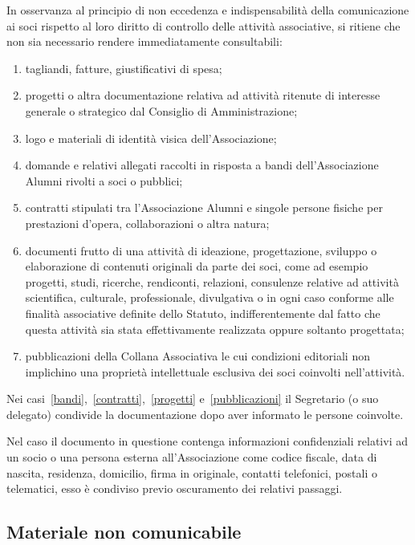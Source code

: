 In osservanza al principio di non eccedenza e indispensabilità della comunicazione ai soci rispetto al loro diritto di controllo delle attività associative, si ritiene che non sia necessario rendere immediatamente consultabili:
\begin{enumerate}
    \item tagliandi, fatture, giustificativi di spesa;
    \item progetti o altra documentazione relativa ad attività ritenute di interesse generale o strategico dal Consiglio di Amministrazione; 
    \item logo e materiali di identità visica dell’Associazione; 
    \item\label{bandi} domande e relativi allegati raccolti in risposta a bandi dell’Associazione Alumni rivolti a soci o pubblici;
    \item\label{contratti} contratti stipulati tra l’Associazione Alumni e singole persone fisiche per prestazioni d’opera, collaborazioni o altra natura; 
    \item\label{progetti} documenti frutto di una attività di ideazione, progettazione, sviluppo o elaborazione di contenuti originali da parte dei soci, come ad esempio progetti, studi, ricerche, rendiconti, relazioni, consulenze relative ad attività scientifica, culturale, professionale, divulgativa o in ogni caso conforme alle finalità associative definite dello Statuto, indifferentemente dal fatto che questa attività sia stata effettivamente realizzata oppure soltanto progettata; 
    \item\label{pubblicazioni} pubblicazioni della Collana Associativa le cui condizioni editoriali non implichino una proprietà intellettuale esclusiva dei soci coinvolti nell’attività.
\end{enumerate}
Nei casi~\ref{bandi},~\ref{contratti},~\ref{progetti} e~\ref{pubblicazioni} il
Segretario (o suo delegato) condivide la documentazione dopo aver informato
le persone coinvolte. 

Nel caso il documento in questione contenga informazioni confidenziali
relativi ad un socio o una persona esterna all’Associazione come codice
fiscale, data di nascita, residenza, domicilio, firma in originale, contatti
telefonici, postali o telematici, esso è condiviso previo oscuramento dei
relativi passaggi.

\subsection{Materiale non comunicabile}\label{materiale-non-comunicabile}

